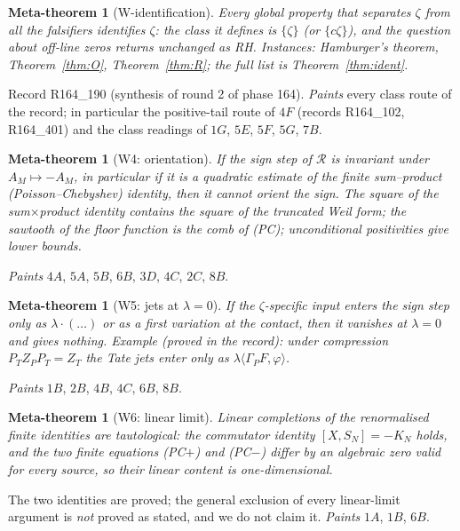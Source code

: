 \documentclass[11pt]{amsart}
\newtheorem{metatheorem}[theorem]{Meta-theorem}
\theoremstyle{definition}
\theoremstyle{remark}
\begin{document}
\begin{metatheorem}[W-identification]\label{Wident}
Every global property that separates $\zeta$ from all the falsifiers identifies $\zeta$: the class it defines is $\{\zeta\}$
(or $\{c\zeta\}$), and the question about off-line zeros returns unchanged as RH. Instances: Hamburger's theorem, Theorem~\ref{thm:O},
Theorem~\ref{thm:R}; the full list is Theorem~\ref{thm:ident}.
\end{metatheorem}
\noindent Record R164\_190 (synthesis of round 2 of phase 164). \emph{Paints} every class route of the record; in particular the
positive-tail route of $4F$ (records R164\_102, R164\_401) and the class readings of $1G$, $5E$, $5F$, $5G$, $7B$.

\begin{metatheorem}[W4: orientation]\label{W4}
If the sign step of $\mathcal R$ is invariant under $A_M\mapsto-A_M$, in particular if it is a quadratic
estimate of the finite sum--product (Poisson--Chebyshev) identity, then it cannot orient the sign. The
square of the sum$\times$product identity contains the square of the truncated Weil form; the sawtooth of
the floor function is the comb of (PC); unconditional positivities give lower bounds.
\end{metatheorem}
\noindent \emph{Paints} $4A$, $5A$, $5B$, $6B$, $3D$, $4C$, $2C$, $8B$.

\begin{metatheorem}[W5: jets at $\lambda=0$]\label{W5}
If the $\zeta$-specific input enters the sign step only as $\lambda\cdot(\dots)$ or as a first variation at
the contact, then it vanishes at $\lambda=0$ and gives nothing. Example (proved in the record): under
compression $P_TZ_PP_T=Z_T$ the Tate jets enter only as $\lambda\langle\Gamma_PF,\varphi\rangle$.
\end{metatheorem}
\noindent \emph{Paints} $1B$, $2B$, $4B$, $4C$, $6B$, $8B$.

\begin{metatheorem}[W6: linear limit]\label{W6}
Linear completions of the renormalised finite identities are tautological: the commutator identity
$[X,S_N]=-K_N$ holds, and the two finite equations (PC$+$) and (PC$-$) differ by an algebraic zero valid for
every source, so their linear content is one-dimensional.
\end{metatheorem}
\noindent The two identities are proved; the general exclusion of every linear-limit argument is
\emph{not} proved as stated, and we do not claim it. \emph{Paints} $1A$, $1B$, $6B$.
\end{document}
